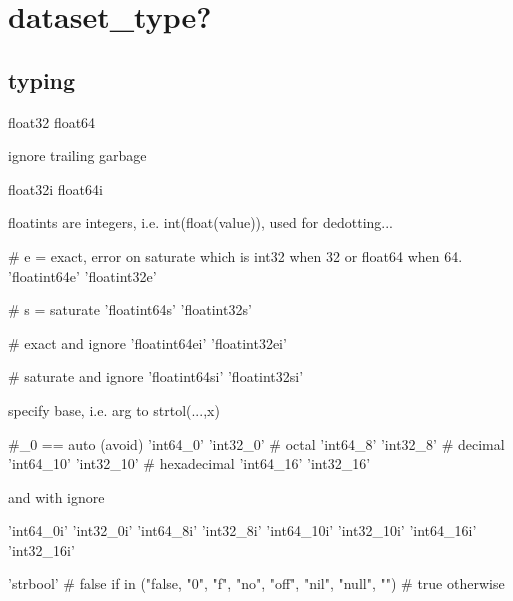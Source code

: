 \section{dataset_type?}

\subsection{typing}

\begin{python}
float32
float64
\end{python}

ignore trailing garbage

\begin{python}
float32i
float64i
\end{python}

floatints are integers, i.e. int(float(value)), used for dedotting...
\begin{python}
# e = exact, error on saturate which is int32 when 32 or float64 when 64.
'floatint64e'  
'floatint32e'  
\end{python}

\begin{python}
# s = saturate
'floatint64s'  
'floatint32s'  
\end{python}

\begin{python}
# exact and ignore
'floatint64ei' 
'floatint32ei' 
\end{python}

\begin{python}
# saturate and ignore
'floatint64si' 
'floatint32si' 
\end{python}

specify base, i.e. arg to strtol(...,x)
\begin{python}
#_0 == auto (avoid)
    'int64_0'      
    'int32_0'      
# octal
    'int64_8'      
    'int32_8'      
# decimal
    'int64_10'     
    'int32_10'     
# hexadecimal
    'int64_16'     
    'int32_16'     
\end{python}

and with ignore
\begin{python}
    'int64_0i'     
    'int32_0i'     
    'int64_8i'     
    'int32_8i'     
    'int64_10i'    
    'int32_10i'    
    'int64_16i'    
    'int32_16i'    
\end{python}

\begin{python}
'strbool'
# false if in ("false, "0", "f", "no", "off", "nil", "null", "")
# true  otherwise
\end{python}

